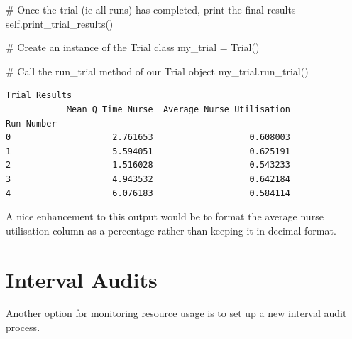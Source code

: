 \documentclass[
  letterpaper,
  DIV=11,
  numbers=noendperiod]{scrreprt}
\newenvironment{Shaded}{\begin{snugshade}}{\end{snugshade}}
\newcommand{\CommentTok}[1]{\textcolor[rgb]{0.37,0.37,0.37}{#1}}
\newcommand{\NormalTok}[1]{\textcolor[rgb]{0.00,0.23,0.31}{#1}}
\newcommand{\OperatorTok}[1]{\textcolor[rgb]{0.37,0.37,0.37}{#1}}
\newcommand{\VariableTok}[1]{\textcolor[rgb]{0.07,0.07,0.07}{#1}}
\begin{document}
\begin{tcolorbox}
\begin{Shaded}
\begin{Highlighting}[]
        \CommentTok{\# Once the trial (ie all runs) has completed, print the final results}
        \VariableTok{self}\NormalTok{.print\_trial\_results()}
\end{Highlighting}
\end{Shaded}

\end{tcolorbox}

\begin{Shaded}
\begin{Highlighting}[]
\CommentTok{\# Create an instance of the Trial class}
\NormalTok{my\_trial }\OperatorTok{=}\NormalTok{ Trial()}

\CommentTok{\# Call the run\_trial method of our Trial object}
\NormalTok{my\_trial.run\_trial()}
\end{Highlighting}
\end{Shaded}

\begin{verbatim}
Trial Results
            Mean Q Time Nurse  Average Nurse Utilisation
Run Number                                              
0                    2.761653                   0.608003
1                    5.594051                   0.625191
2                    1.516028                   0.543233
3                    4.943532                   0.642184
4                    6.076183                   0.584114
\end{verbatim}

\begin{tcolorbox}[enhanced jigsaw, rightrule=.15mm, colback=white, colframe=quarto-callout-tip-color-frame, colbacktitle=quarto-callout-tip-color!10!white, toprule=.15mm, coltitle=black, opacityback=0, titlerule=0mm, bottomtitle=1mm, breakable, title=\textcolor{quarto-callout-tip-color}{\faLightbulb}\hspace{0.5em}{Tip}, opacitybacktitle=0.6, toptitle=1mm, arc=.35mm, bottomrule=.15mm, leftrule=.75mm, left=2mm]

A nice enhancement to this output would be to format the average nurse
utilisation column as a percentage rather than keeping it in decimal
format.

\end{tcolorbox}

\section{Interval Audits}\label{interval-audits}

Another option for monitoring resource usage is to set up a new interval
audit process.
\end{document}
